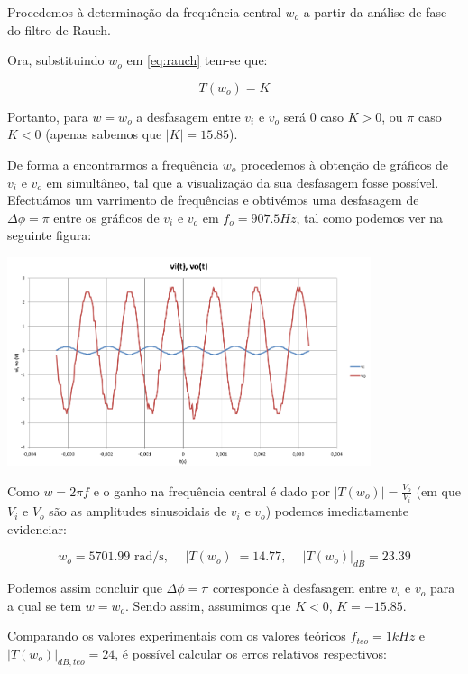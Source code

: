 \documentclass[a4paper,11pt]{report}
\begin{document}
Procedemos à determinação da frequência central $w_o$ a partir da análise de fase do filtro de Rauch. 

Ora, substituindo $w_o$ em \ref{eq:rauch} tem-se que:

$$T(w_o)=K$$


Portanto, para $w=w_o$ a desfasagem entre $v_i$ e $v_o$ será $0$ caso $K>0$, ou $\pi$ caso $K<0$ (apenas sabemos que $|K|=15.85$).

De forma a encontrarmos a frequência $w_o$ procedemos à obtenção de gráficos de $v_i$ e $v_o$ em simultâneo, tal que a visualização da sua desfasagem fosse possível. Efectuámos um varrimento de frequências e obtivémos uma desfasagem de $\Delta\phi=\pi$ entre os gráficos de $v_i$ e $v_o$ em $f_o=907.5Hz$, tal como podemos ver na seguinte figura:

\begin{center}
    \includegraphics[angle=0,width=0.8\textwidth]{F0.png}
    \label{fig:F0}
    \end{center}

Como $w=2\pi f$ e o ganho na frequência central é dado por $|T(w_o)|=\frac{V_o}{V_i}$ (em que $V_i$ e $V_o$ são as amplitudes sinusoidais de $v_i$ e $v_o$) podemos imediatamente evidenciar:

$$w_o=5701.99 \text{ rad/s}, \hspace{15pt} |T(w_o)|=14.77, \hspace{15pt} |T(w_o)|_{dB}=23.39 $$

Podemos assim concluir que $\Delta \phi=\pi$ corresponde à desfasagem entre $v_i$ e $v_o$ para a qual se tem $w=w_o$. Sendo assim, assumimos que $K<0$, $K=-15.85$.

Comparando os valores experimentais com os valores teóricos $f_{teo}=1kHz$ e $|T(w_o)|_{dB,teo}=24$, é possível calcular os erros relativos respectivos:
\end{document}
